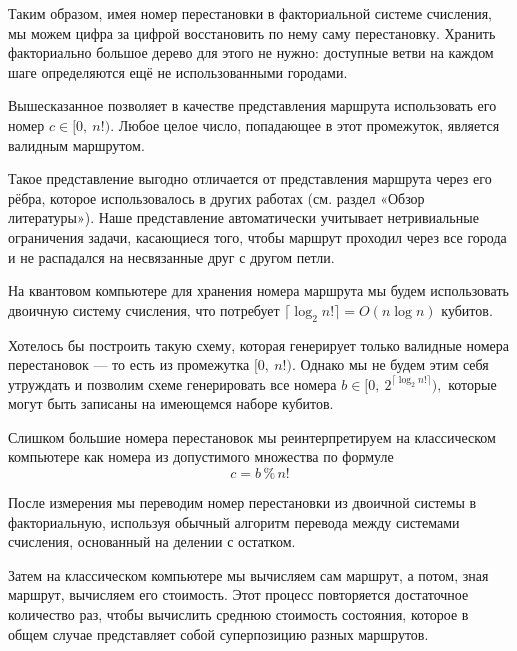 Таким образом, имея номер перестановки в факториальной системе счисления, мы можем цифра за цифрой восстановить по нему саму перестановку. Хранить факториально большое дерево для этого не нужно: доступные ветви на каждом шаге определяются ещё не использованными городами.


Вышесказанное позволяет в качестве представления маршрута использовать его номер $c \in [0,\: n!)$. Любое целое число, попадающее в этот промежуток, является валидным маршрутом.

Такое представление выгодно отличается от представления маршрута через его рёбра, которое использовалось в других работах (см. раздел «Обзор литературы»). Наше представление автоматически учитывает нетривиальные ограничения задачи, касающиеся того, чтобы маршрут проходил через все города и не распадался на несвязанные друг с другом петли.

На квантовом компьютере для хранения номера маршрута мы будем использовать двоичную систему счисления, что потребует $\lceil \log_2 n! \rceil = O(n \log n)$ кубитов. 

Хотелось бы построить такую схему, которая генерирует только валидные номера перестановок --- то есть из промежутка $[0,\: n!)$. Однако мы не будем этим себя утруждать и позволим схеме генерировать все номера $b \in [0,\: 2^{\lceil \log_2 n! \rceil}),$ которые могут быть записаны на имеющемся наборе кубитов.

Слишком большие номера перестановок мы реинтерпретируем на классическом компьютере как номера из допустимого множества по формуле
$$c = b \mathbin{\%} n!$$

После измерения мы переводим номер перестановки из двоичной системы в факториальную, используя обычный алгоритм перевода между системами счисления, основанный на делении с остатком.

Затем на классическом компьютере мы вычисляем сам маршрут, а потом, зная маршрут, вычисляем его стоимость. Этот процесс повторяется достаточное количество раз, чтобы вычислить среднюю стоимость состояния, которое в общем случае представляет собой суперпозицию разных маршрутов.




